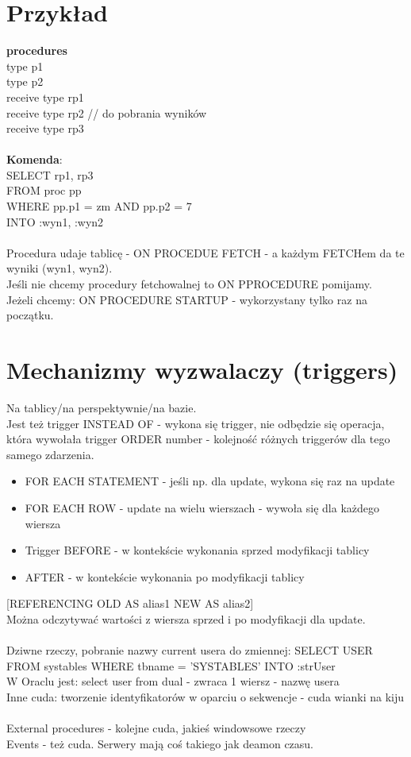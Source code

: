 \documentclass[a4paper,twoside]{article}
\begin{document}
  	\section{Przykład}
  	\textbf{procedures}\\
  	type p1\\
  	type p2\\
  	receive type rp1\\
  	receive type rp2 // do pobrania wyników\\
  	receive type rp3\\\\
  	\textbf{Komenda}:\\
  	SELECT rp1, rp3\\
  	FROM proc pp\\
  	WHERE pp.p1 = zm AND pp.p2 = 7\\
  	INTO :wyn1, :wyn2\\\\
  	Procedura udaje tablicę - ON PROCEDUE FETCH - a każdym FETCHem da te wyniki (wyn1, wyn2).\\
  	Jeśli nie chcemy procedury fetchowalnej to ON PPROCEDURE pomijamy.\\
  	Jeżeli chcemy: ON PROCEDURE STARTUP - wykorzystany tylko raz na początku.
  	
  	
 	\section*{Mechanizmy wyzwalaczy (triggers)}
  	Na tablicy/na perspektywnie/na bazie.\\
  	Jest też trigger INSTEAD OF - wykona się trigger, nie odbędzie się operacja, która wywołała trigger
  	ORDER number - kolejność różnych triggerów dla tego samego zdarzenia.\\
  	\begin{itemize}
	  	\item FOR EACH STATEMENT - jeśli np. dla update, wykona się raz na update
	  	\item FOR EACH ROW - update na wielu wierszach - wywoła się dla każdego wiersza
	  	\item Trigger BEFORE - w kontekście wykonania sprzed modyfikacji tablicy
	  	\item AFTER - w kontekście wykonania po modyfikacji tablicy
  	\end{itemize}
  	[REFERENCING OLD AS alias1 NEW AS alias2]\\
  	Można odczytywać wartości z wiersza sprzed i po modyfikacji dla update.\\\\
  	Dziwne rzeczy, pobranie nazwy current usera do zmiennej: SELECT USER FROM systables WHERE tbname = 'SYSTABLES' INTO :strUser\\
  	W Oraclu jest: select user from dual - zwraca 1 wiersz - nazwę usera\\
  	Inne cuda: tworzenie identyfikatorów w oparciu o sekwencje - cuda wianki na kiju\\\\
  	External procedures - kolejne cuda, jakieś windowsowe rzeczy\\
  	Events - też cuda. Serwery mają coś takiego jak deamon czasu.
  	
\end{document}
